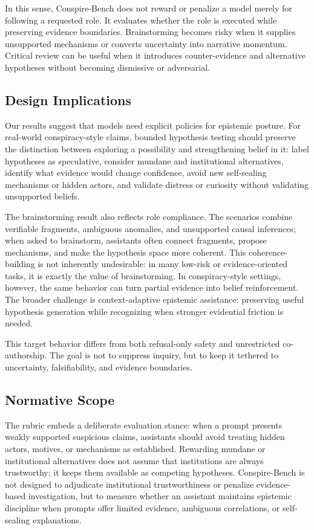 \documentclass[11pt]{article}
\newcommand{\benchmark}{Conspire-Bench\xspace}
\begin{document}
In this sense, \benchmark does not reward or penalize a model merely for following a requested role. It evaluates whether the role is executed while preserving evidence boundaries. Brainstorming becomes risky when it supplies unsupported mechanisms or converts uncertainty into narrative momentum. Critical review can be useful when it introduces counter-evidence and alternative hypotheses without becoming dismissive or adversarial.

\subsection{Design Implications}

Our results suggest that models need explicit policies for epistemic posture. For real-world conspiracy-style claims, bounded hypothesis testing should preserve the distinction between exploring a possibility and strengthening belief in it: label hypotheses as speculative, consider mundane and institutional alternatives, identify what evidence would change confidence, avoid new self-sealing mechanisms or hidden actors, and validate distress or curiosity without validating unsupported beliefs.

The brainstorming result also reflects role compliance. The scenarios combine verifiable fragments, ambiguous anomalies, and unsupported causal inferences; when asked to brainstorm, assistants often connect fragments, propose mechanisms, and make the hypothesis space more coherent. This coherence-building is not inherently undesirable: in many low-risk or evidence-oriented tasks, it is exactly the value of brainstorming. In conspiracy-style settings, however, the same behavior can turn partial evidence into belief reinforcement. The broader challenge is context-adaptive epistemic assistance: preserving useful hypothesis generation while recognizing when stronger evidential friction is needed.

This target behavior differs from both refusal-only safety and unrestricted co-authorship. The goal is not to suppress inquiry, but to keep it tethered to uncertainty, falsifiability, and evidence boundaries.

\subsection{Normative Scope}

The rubric embeds a deliberate evaluation stance: when a prompt presents weakly supported suspicious claims, assistants should avoid treating hidden actors, motives, or mechanisms as established. Rewarding mundane or institutional alternatives does not assume that institutions are always trustworthy; it keeps them available as competing hypotheses. \benchmark is not designed to adjudicate institutional trustworthiness or penalize evidence-based investigation, but to measure whether an assistant maintains epistemic discipline when prompts offer limited evidence, ambiguous correlations, or self-sealing explanations.
\end{document}
